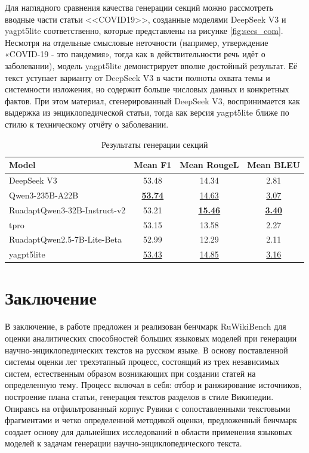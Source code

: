\documentclass{article}
\begin{document}
Для наглядного сравнения качества генерации секций можно рассмотреть вводные части статьи <<COVID19>>, 
созданные моделями DeepSeek V3 и yagpt5lite соответственно, которые представлены на рисунке \ref{fig:secs_com}.
Несмотря на отдельные смысловые неточности (например, утверждение «COVID-19 - это пандемия», тогда как в действительности речь идёт о заболевании), 
модель yagpt5lite демонстрирует вполне достойный результат. Её текст уступает варианту от DeepSeek V3 в части полноты охвата темы и системности изложения, 
но содержит больше числовых данных и конкретных фактов. При этом материал, сгенерированный DeepSeek V3, воспринимается как выдержка из энциклопедической статьи, 
тогда как версия yagpt5lite ближе по стилю к техническому отчёту о заболевании.

\begin{table}[ht!]
\centering
\caption{Результаты генерации секций}
\begin{tabular}{l|c|c|c}
\hline
\textbf{Model} & \textbf{Mean F1} & \textbf{Mean RougeL} & \textbf{Mean BLEU} \\
\hline
DeepSeek V3                                         & 53.48 & 14.34 & 2.81 \\
Qwen3-235B-A22B                                     & \uline{\textbf{53.74}} & \uline{14.63} & \uline{3.07} \\
\hline
RuadaptQwen3-32B-Instruct-v2                        & 53.21 & \uline{\textbf{15.46}} & \uline{\textbf{3.40}} \\
tpro                                                & 53.15 & 13.58 & 2.27 \\
\hline
RuadaptQwen2.5-7B-\allowbreak Lite-\allowbreak Beta & 52.99 & 12.29 & 2.11 \\
yagpt5lite                                          & \uline{53.43} & \uline{14.85} & \uline{3.16} \\
\hline
\end{tabular}
\label{tab:secs}
\end{table}

\FloatBarrier
\section*{Заключение}
В заключение, в работе предложен и реализован бенчмарк RuWikiBench для оценки аналитических способностей больших языковых моделей при генерации научно-энциклопедических текстов на русском языке.
В основу поставленной системы оценки лег трехэтапный процесс, состоящий из трех независимых систем, естественным образом возникающих при создании статей на определенную тему.
Процесс включал в себя: отбор и ранжирование источников, построение плана статьи, генерация текстов разделов в стиле Википедии.
Опираясь на отфильтрованный корпус Рувики с сопоставленными текстовыми фрагментами и четко определенной методикой оценки, 
предложенный бенчмарк создает основу для дальнейших исследований в области применения языковых моделей к задачам генерации научно-энциклопедического текста. 
\end{document}
